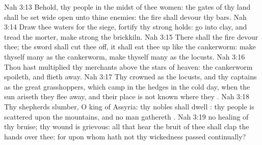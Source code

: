 \vs Nah 3:13 Behold, thy people in the midst of thee  women: the gates of thy land shall be set wide open unto thine enemies: the fire shall devour thy bars.
\vs Nah 3:14 Draw thee waters for the siege, fortify thy strong holds: go into clay, and tread the morter, make strong the brickkiln.
\vs Nah 3:15 There shall the fire devour thee; the sword shall cut thee off, it shall eat thee up like the cankerworm: make thyself many as the cankerworm, make thyself many as the locusts.
\vs Nah 3:16 Thou hast multiplied thy merchants above the stars of heaven: the cankerworm spoileth, and flieth away.
\vs Nah 3:17 Thy crowned  as the locusts, and thy captains as the great grasshoppers, which camp in the hedges in the cold day,  when the sun ariseth they flee away, and their place is not known where they .
\vs Nah 3:18 Thy shepherds slumber, O king of Assyria: thy nobles shall dwell : thy people is scattered upon the mountains, and no man gathereth .
\vs Nah 3:19  no healing of thy bruise; thy wound is grievous: all that hear the bruit of thee shall clap the hands over thee: for upon whom hath not thy wickedness passed continually?
